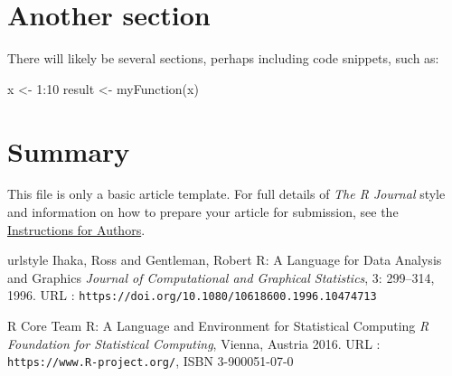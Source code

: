 \section{Another section}

There will likely be several sections, perhaps including code snippets, such as:

\begin{example}
  x <- 1:10
  result <- myFunction(x)
\end{example}

\section{Summary}

This file is only a basic article template. For full details of \emph{The R Journal} style and information on how to prepare your article for submission, see the \href{https://journal.r-project.org/share/author-guide.pdf}{Instructions for Authors}.


\begin{thebibliography}{20}
    \providecommand{\natexlab}[1]{#1}
    \providecommand{\url}[1]{\texttt{#1}}
    \expandafter\ifx\csname urlstyle\endcsname\relax
      \providecommand{\doi}[1]{doi: #1}\else
      \providecommand{\doi}{doi: \begingroup \urlstyle{rm}\Url}\fi
{}
Ihaka, Ross and Gentleman, Robert
\newblock R: A Language for Data Analysis and Graphics
\newblock \emph{Journal of Computational and Graphical Statistics}, 3:
299--314, 1996.
\newblock URL : \url{https://doi.org/10.1080/10618600.1996.10474713}

R Core Team
\newblock R: A Language and Environment for Statistical Computing
\newblock \emph{R Foundation for Statistical Computing}, Vienna, Austria  2016.
\newblock URL : \url{https://www.R-project.org/}, ISBN 3-900051-07-0
\end{thebibliography}

\address{Author One\\
  Affiliation\\
  Address\\
  Country\\
  (ORCiD if desired)\\
}

\address{Author Two\\
  Affiliation\\
  Address\\
  Country\\
  (ORCiD if desired)\\
}

\address{Author Three\\
  Affiliation\\
  Address\\
  Country\\
  (ORCiD if desired)\\
 }
